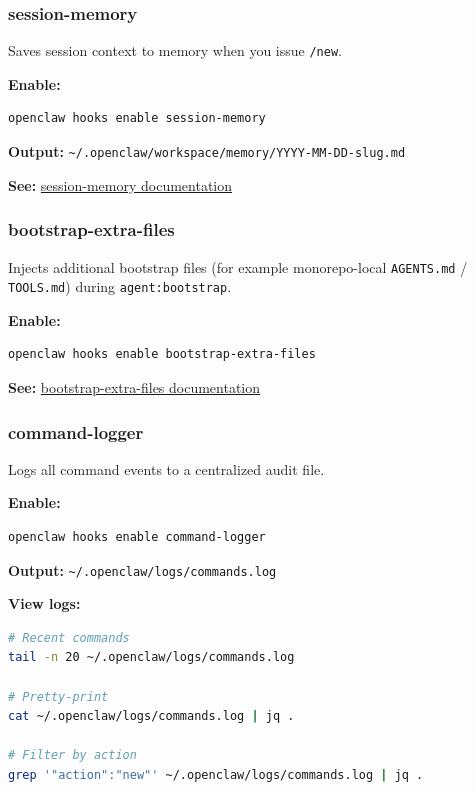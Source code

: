 \subsubsection{session-memory}


Saves session context to memory when you issue \texttt{/new}.

\textbf{Enable:}

\begin{lstlisting}[language=bash]
openclaw hooks enable session-memory
\end{lstlisting}


\textbf{Output:} \texttt{\textasciitilde{}/.openclaw/workspace/memory/YYYY-MM-DD-slug.md}

\textbf{See:} \href{/automation/hooks\#session-memory}{session-memory documentation}

\subsubsection{bootstrap-extra-files}


Injects additional bootstrap files (for example monorepo-local \texttt{AGENTS.md} / \texttt{TOOLS.md}) during \texttt{agent:bootstrap}.

\textbf{Enable:}

\begin{lstlisting}[language=bash]
openclaw hooks enable bootstrap-extra-files
\end{lstlisting}


\textbf{See:} \href{/automation/hooks\#bootstrap-extra-files}{bootstrap-extra-files documentation}

\subsubsection{command-logger}


Logs all command events to a centralized audit file.

\textbf{Enable:}

\begin{lstlisting}[language=bash]
openclaw hooks enable command-logger
\end{lstlisting}


\textbf{Output:} \texttt{\textasciitilde{}/.openclaw/logs/commands.log}

\textbf{View logs:}

\begin{lstlisting}[language=bash]
# Recent commands
tail -n 20 ~/.openclaw/logs/commands.log

# Pretty-print
cat ~/.openclaw/logs/commands.log | jq .

# Filter by action
grep '"action":"new"' ~/.openclaw/logs/commands.log | jq .
\end{lstlisting}


